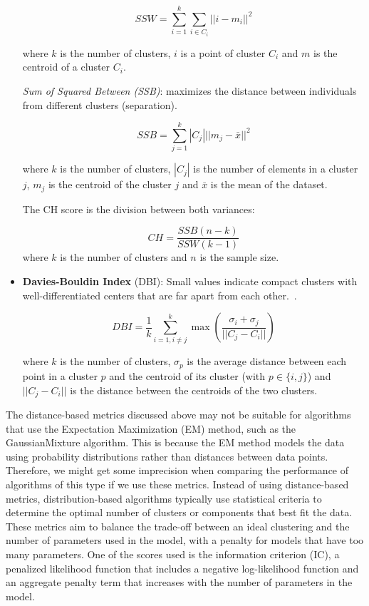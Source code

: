\begin{itemize}
\begin{equation}
    SSW = \sum_{i=1}^k\sum_{i\in C_i} ||i-m_i||^2
\end{equation}

where $k$ is the number of clusters, $i$ is a point of cluster $C_i$ and $m$ is the centroid of a cluster $C_i$.

\textit{Sum of Squared Between (SSB)}: maximizes the distance between individuals from different clusters (separation).

\begin{equation}
    SSB = \sum_{j=1}^k|C_j|||m_j-\bar{x}||^2
\end{equation}


where $k$ is the number of clusters, $|C_j|$ is the number of elements in a cluster $j$, $m_j$ is the centroid of the cluster $j$ and $\bar{x}$ is the mean of the dataset.

The CH score is the division between both variances:

\begin{equation}
    CH=\frac{SSB(n-k)}{SSW(k-1)}
\end{equation}
  where $k$ is the number of clusters and $n$ is the sample size. 
 
    
    \item \textbf{Davies-Bouldin Index} (DBI): Small values indicate compact clusters with well-differentiated centers that are far apart from each other.~\cite{davies1979cluster}. {\color{black} 

    \begin{equation}
    DBI=\frac{1}{k} \sum_{i=1,i\neq j}^ k \max(\frac{\sigma_i+\sigma_j}{||C_j-C_i||})
    \end{equation}

    where $k$ is the number of clusters, $\sigma_p$ is the average distance between each point in a cluster $p$ and the centroid of its cluster (with $p \in \{i,j\}$) and $||C_j-C_i||$ is the distance between the centroids of the two clusters.
    
    }
\end{itemize}


The distance-based metrics discussed above may not be suitable for algorithms that use the Expectation Maximization (EM) method, such as the GaussianMixture algorithm. This is because the EM method models the data using probability distributions rather than distances between data points. Therefore, we might get some imprecision when comparing the performance of algorithms of this type if we use these metrics. Instead of using distance-based metrics, distribution-based algorithms typically use statistical criteria to determine the optimal number of clusters or components that best fit the data. These metrics aim to balance the trade-off between an ideal clustering and the number of parameters used in the model, with a penalty for models that have too many parameters. One of the scores used is the information criterion (IC), a penalized likelihood function that includes a negative log-likelihood function and an aggregate penalty term that increases with the number of parameters in the model. 


